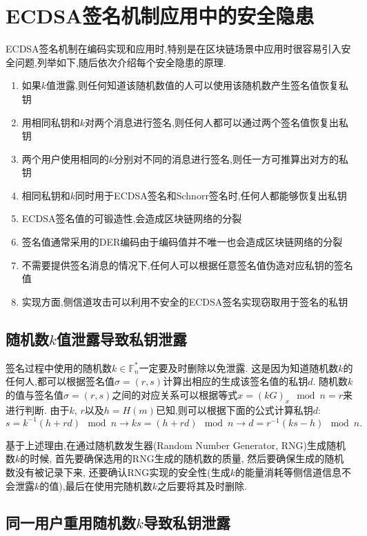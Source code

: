 \documentclass{article}
\newcommand{\F}{\mathbb{F}}
\begin{document}
\section{ECDSA签名机制应用中的安全隐患}

ECDSA签名机制在编码实现和应用时,特别是在区块链场景中应用时很容易引入安全问题,列举如下,随后依次介绍每个安全隐患的原理.
\begin{enumerate}
\item 如果$k$值泄露,则任何知道该随机数值的人可以使用该随机数产生签名值恢复私钥
\item 用相同私钥和$k$对两个消息进行签名,则任何人都可以通过两个签名值恢复出私钥
\item 两个用户使用相同的$k$分别对不同的消息进行签名,则任一方可推算出对方的私钥
\item 相同私钥和$k$同时用于ECDSA签名和Schnorr签名时,任何人都能够恢复出私钥
\item ECDSA签名值的可锻造性,会造成区块链网络的分裂
\item 签名值通常采用的DER编码由于编码值并不唯一也会造成区块链网络的分裂
\item 不需要提供签名消息的情况下,任何人可以根据任意签名值伪造对应私钥的签名值
\item 实现方面,侧信道攻击可以利用不安全的ECDSA签名实现窃取用于签名的私钥
\end{enumerate}

\subsection{随机数$k$值泄露导致私钥泄露}

签名过程中使用的随机数$k\in\F_n^*$一定要及时删除以免泄露.
这是因为知道随机数$k$的任何人,都可以根据签名值$\sigma=(r,s)$计算出相应的生成该签名值的私钥$d$.
随机数$k$的值与签名值$\sigma=(r,s)$之间的对应关系可以根据等式$x = (kG)_x \mod n = r$来进行判断.
由于$k$, $r$以及$h=H(m)$已知,则可以根据下面的公式计算私钥$d$:
$$s=k^{-1}(h+rd) \mod n \rightarrow ks = (h + rd)\mod n \rightarrow d = r^{-1}(ks - h)\mod n.$$

基于上述理由,在通过随机数发生器(Random Number Generator, RNG)生成随机数$k$的时候,
首先要确保选用的RNG生成的随机数的质量, 然后要确保生成的随机数没有被记录下来, 
还要确认RNG实现的安全性(生成$k$的能量消耗等侧信道信息不会泄露$k$的值),最后在使用完随机数$k$之后要将其及时删除.

\subsection{同一用户重用随机数$k$导致私钥泄露}
\end{document}
